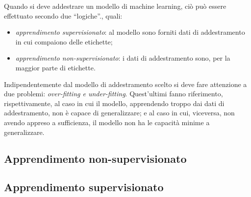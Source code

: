 \documentclass{subfiles}
\begin{document}
Quando si deve addestrare un modello di machine learning, ciò può essere effettuato secondo due ``logiche''., quali:
\begin{itemize}
    \item \emph{apprendimento supervisionato}: al modello sono forniti dati di addestramento in cui compaiono delle etichette\footnotemark[1];
    \item \emph{apprendimento non-supervisionato}: i dati di addestramento sono, per la maggior parte di etichette.
\end{itemize}

Indipendentemente dal modello di addestramento scelto si deve fare attenzione a due problemi: \emph{over-fitting \emph{e} under-fitting}.
Quest'ultimi fanno riferimento, rispettivamente, al caso in cui il modello, apprendendo troppo dai dati di addestramento,
non è capace di generalizzare; e al caso in cui, viceversa, non avendo appreso a sufficienza, il modello non ha le capacità minime a generalizzare.

\subsection{Apprendimento non-supervisionato}


\subsection{Apprendimento supervisionato}

\clearpage
\end{document}
